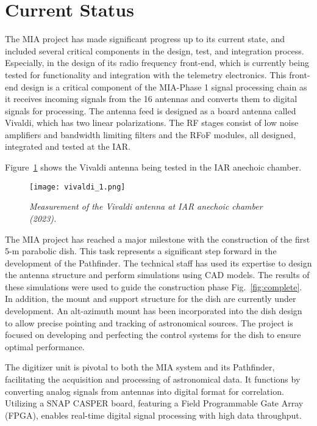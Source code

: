 \documentclass[baaa]{baaa}
\begin{document}
\section{Current Status}
\label{sec:status}
The MIA project has made significant progress up to its current state, and included several critical components in the design, test, and integration process. Especially, in the design of its radio frequency front-end, which is currently being tested for functionality and integration with the telemetry electronics. This front-end design is a critical component of the MIA-Phase 1 signal processing chain as it receives incoming signals from the 16 antennas and converts them to digital signals for processing. The antenna feed is designed as a board antenna called Vivaldi, which has two linear polarizations. The RF stages consist of low noise amplifiers and bandwidth limiting filters and the RFoF modules, all designed, integrated and tested at the IAR.

Figure~\ref{fig:antcai} shows the Vivaldi antenna being tested in the IAR anechoic chamber.

\begin{figure}[!t]
  \texttt{[image: vivaldi\_1.png]}
  \caption{\emph{Measurement of the Vivaldi antenna at IAR anechoic chamber (2023).}}
  \label{fig:antcai}
\end{figure}

The MIA project has reached a major milestone with the construction of the first 5-m parabolic dish. This task represents a significant step forward in the development of the Pathfinder. The technical staff has used its expertise to design the antenna structure and perform simulations using CAD models. The results of these simulations were used to guide the construction phase Fig.~\ref{fig:complete}. In addition, the mount and support structure for the dish are currently under development. An alt-azimuth mount has been incorporated into the dish design to allow precise pointing and tracking of astronomical sources. The project is focused on developing and perfecting the control systems for the dish to ensure optimal performance.

The digitizer unit is pivotal to both the MIA system and its Pathfinder, facilitating the acquisition and processing of astronomical data. It functions by converting analog signals from antennas into digital format for correlation. Utilizing a SNAP CASPER board, featuring a Field Programmable Gate Array (FPGA), enables real-time digital signal processing with high data throughput.
\end{document}
